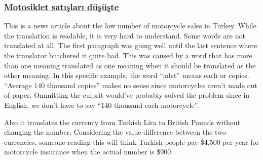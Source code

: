 \documentclass[10pt,letterpaper,bibliography=totoc]{scrartcl}
\begin{document}
\subsubsection{\href{http://www.motosikletdergisi.com/haber/436/motosiklet-satislari-dususte.html}{Motosiklet satışları düşüşte}}
This is a news article about the low number of motorcycle sales in Turkey. While the translation is readable, it is very hard to understand. Some words are not translated at all. The first paragraph was going well until the last sentence where the translator butchered it quite bad. This was caused by a word that has more than one meaning translated as one meaning when it should be translated as the other meaning. In this specific example, the word ``adet'' means each or copies. ``Average 140 thousand copies'' makes no sense since motorcycles aren't made out of paper. Ommitting the culprit would've probably solved the problem since in English, we don't have to say ``140 thousand each motorcycle''. 

Also it translates the currency from Turkish Lira to British Pounds without changing the number. Considering the value difference between the two currencies, someone reading this will think Turkish people pay \$4,500 per year for motorcycle insurance when the actual number is \$900.
\end{document}

